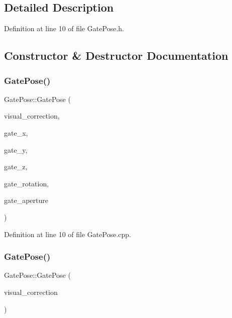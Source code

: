 \subsection{Detailed Description}


Definition at line 10 of file Gate\+Pose.\+h.



\subsection{Constructor \& Destructor Documentation}
\mbox{\label{classGatePose_a27001df58131fc1431f1a3d768698494}} 
\subsubsection{\texorpdfstring{Gate\+Pose()}{GatePose()}\hspace{0.1cm}{\footnotesize\ttfamily [1/2]}}
{\footnotesize\ttfamily Gate\+Pose\+::\+Gate\+Pose (\begin{DoxyParamCaption}\item[{std\+::unique\+\_\+ptr$<$ P\+F\+Visual\+Correction $>$}]{visual\+\_\+correction,  }\item[{const double}]{gate\+\_\+x,  }\item[{const double}]{gate\+\_\+y,  }\item[{const double}]{gate\+\_\+z,  }\item[{const double}]{gate\+\_\+rotation,  }\item[{const double}]{gate\+\_\+aperture }\end{DoxyParamCaption})\hspace{0.3cm}{\ttfamily [noexcept]}}



Definition at line 10 of file Gate\+Pose.\+cpp.

\mbox{\label{classGatePose_a27e224f41699efe5949e2fb876b1d9ee}} 
\subsubsection{\texorpdfstring{Gate\+Pose()}{GatePose()}\hspace{0.1cm}{\footnotesize\ttfamily [2/2]}}
{\footnotesize\ttfamily Gate\+Pose\+::\+Gate\+Pose (\begin{DoxyParamCaption}\item[{std\+::unique\+\_\+ptr$<$ P\+F\+Visual\+Correction $>$}]{visual\+\_\+correction }\end{DoxyParamCaption})\hspace{0.3cm}{\ttfamily [noexcept]}}



